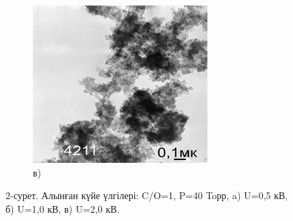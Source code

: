 \begin{figure}[H]
\begin{subfigure}[b]{0.32\textwidth}
        \centering
        \includegraphics[width=\textwidth]{assets/31}
        \caption*{в)}
    \end{subfigure}
    \caption*{2-сурет. Алынған күйе үлгілері: C/O=1, P=40 Toрр, a) U=0,5 кВ, б) U=1,0 кВ, в) U=2,0 кВ.}
\end{figure}


